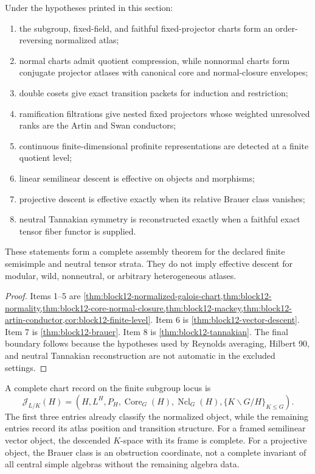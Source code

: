 \begin{theorem}
\label{thm:block12-galois-assembly}
Under the hypotheses printed in this section:
\begin{enumerate}
\item the subgroup, fixed-field, and faithful fixed-projector charts form an order-reversing normalized atlas;
\item normal charts admit quotient compression, while nonnormal charts form conjugate projector atlases with canonical core and normal-closure envelopes;
\item double cosets give exact transition packets for induction and restriction;
\item ramification filtrations give nested fixed projectors whose weighted unresolved ranks are the Artin and Swan conductors;
\item continuous finite-dimensional profinite representations are detected at a finite quotient level;
\item linear semilinear descent is effective on objects and morphisms;
\item projective descent is effective exactly when its relative Brauer class vanishes;
\item neutral Tannakian symmetry is reconstructed exactly when a faithful exact tensor fiber functor is supplied.
\end{enumerate}
These statements form a complete assembly theorem for the declared finite semisimple and neutral tensor strata.  They do not imply effective descent for modular, wild, nonneutral, or arbitrary heterogeneous atlases.
\end{theorem}

\begin{proof}
Items 1--5 are \cref{thm:block12-normalized-galois-chart,thm:block12-normality,thm:block12-core-normal-closure,thm:block12-mackey,thm:block12-artin-conductor,cor:block12-finite-level}.  Item 6 is \cref{thm:block12-vector-descent}.  Item 7 is \cref{thm:block12-brauer}.  Item 8 is \cref{thm:block12-tannakian}.  The final boundary follows because the hypotheses used by Reynolds averaging, Hilbert 90, and neutral Tannakian reconstruction are not automatic in the excluded settings.
\end{proof}

A complete chart record on the finite subgroup locus is
\[
 \mathcal J_{L/K}(H)
 =
 \left(
 H,
 L^H,
 P_H,
 \operatorname{Core}_G(H),
 \operatorname{Ncl}_G(H),
 \{K\backslash G/H\}_{K\leq G}
 \right).
\]
The first three entries already classify the normalized object, while the remaining entries record its atlas position and transition structure.  For a framed semilinear vector object, the descended \(K\)-space with its frame is complete.  For a projective object, the Brauer class is an obstruction coordinate, not a complete invariant of all central simple algebras without the remaining algebra data.

